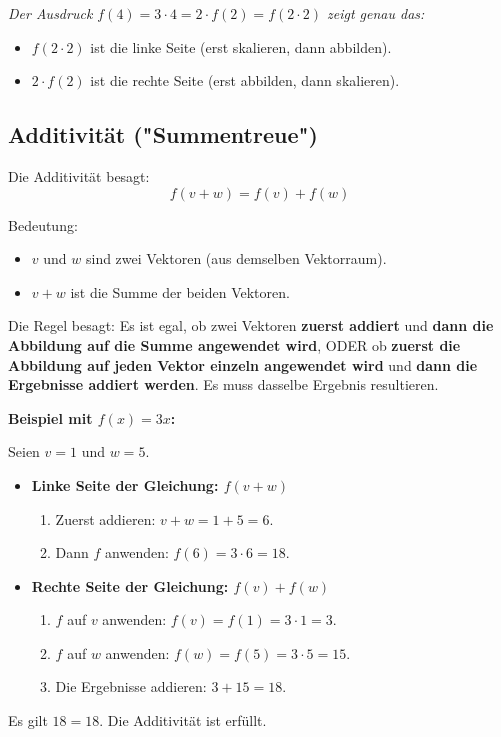 \textit{Der Ausdruck $f(4) = 3 \cdot 4 = 2 \cdot f(2) = f(2 \cdot 2)$ zeigt genau das:}
\begin{itemize}
    \item $f(2 \cdot 2)$ ist die linke Seite (erst skalieren, dann abbilden).
    \item $2 \cdot f(2)$ ist die rechte Seite (erst abbilden, dann skalieren).
\end{itemize}

\subsection{Additivität ("Summentreue")}

Die Additivität besagt:
$$f(v + w) = f(v) + f(w)$$

Bedeutung:
\begin{itemize}
    \item $v$ und $w$ sind zwei Vektoren (aus demselben Vektorraum).
    \item $v+w$ ist die Summe der beiden Vektoren.
\end{itemize}
Die Regel besagt: Es ist egal, ob zwei Vektoren \textbf{zuerst addiert} und \textbf{dann die Abbildung auf die Summe angewendet wird}, ODER ob \textbf{zuerst die Abbildung auf jeden Vektor einzeln angewendet wird} und \textbf{dann die Ergebnisse addiert werden}. Es muss dasselbe Ergebnis resultieren.

\textbf{Beispiel mit $f(x) = 3x$:}

Seien $v=1$ und $w=5$.
\begin{itemize}
    \item \textbf{Linke Seite der Gleichung: $f(v+w)$}
    \begin{enumerate}
        \item Zuerst addieren: $v+w = 1+5 = 6$.
        \item Dann $f$ anwenden: $f(6) = 3 \cdot 6 = 18$.
    \end{enumerate}
    \item \textbf{Rechte Seite der Gleichung: $f(v) + f(w)$}
    \begin{enumerate}
        \item $f$ auf $v$ anwenden: $f(v) = f(1) = 3 \cdot 1 = 3$.
        \item $f$ auf $w$ anwenden: $f(w) = f(5) = 3 \cdot 5 = 15$.
        \item Die Ergebnisse addieren: $3 + 15 = 18$.
    \end{enumerate}
\end{itemize}
Es gilt $18 = 18$. Die Additivität ist erfüllt.

